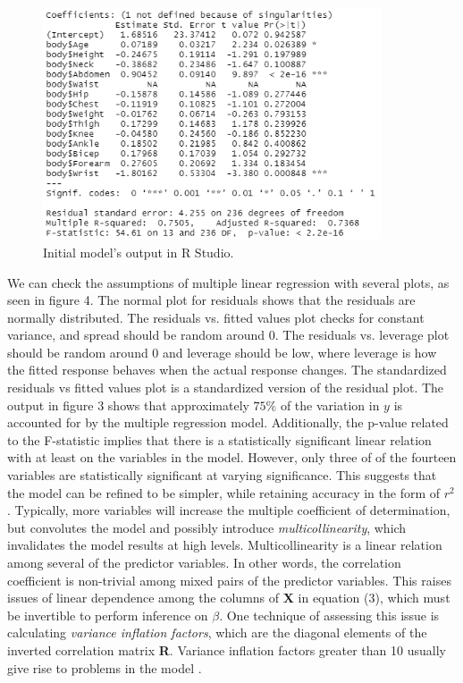 \documentclass[12pt]{article}
\begin{document}
\begin{figure}[h]
\centering
\includegraphics[width = 100mm]{model1_output.PNG}
\caption{Initial model's output in R Studio.}
\label{model1_output}
\end{figure}
We can check the assumptions of multiple linear regression with several plots, as seen in figure 4. The normal plot for residuals shows that the residuals are normally distributed. The residuals vs. fitted values plot checks for constant variance, and spread should be random around 0. The residuals vs. leverage plot should be random around 0 and leverage should be low, where leverage is how the fitted response behaves when the actual response changes. The standardized residuals vs fitted values plot is a standardized version of the residual plot. The output in figure 3 shows that approximately $75\%$ of the variation in $y$ is accounted for by the multiple regression model. Additionally, the p-value related to the F-statistic implies that there is a statistically significant linear relation with at least on the variables in the model. However, only three of of the fourteen variables are statistically significant at varying significance. This suggests that the model can be refined to be simpler, while retaining accuracy in the form of $r^2$. Typically, more variables will increase the multiple coefficient of determination, but convolutes the model and possibly introduce \textit{multicollinearity}, which invalidates the model results at high levels. Multicollinearity is a linear relation among several of the predictor variables. In other words, the correlation coefficient is non-trivial among mixed pairs of the predictor variables. This raises issues of linear dependence among the columns of \textbf{X} in equation (3), which must be invertible to perform inference on $\beta$. One technique of assessing this issue is calculating \textit{variance inflation factors}, which are the diagonal elements of the inverted correlation matrix \textbf{R}. Variance inflation factors greater than 10 usually give rise to problems in the model \cite{Tamhane}.
\end{document}
